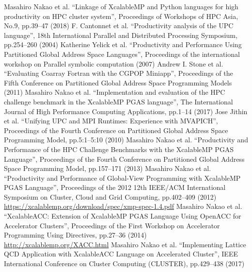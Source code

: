 \begin{thebibliography}{99.}%
%
%
 Masahiro Nakao  et al.
``Linkage of XcalableMP and Python languages for high productivity on HPC cluster system'', Proceedings of Workshops of HPC Asia, No.9, pp.39--47 (2018)
%
 F. Cantonnet et al.
  ``Productivity analysis of the UPC language'', 18th International Parallel and Distributed Processing Symposium, pp.254--260 (2004)
%
 Katherine Yelick et al.
  ``Productivity and Performance Using Partitioned Global Address Space Languages'', Proceedings of the international workshop on Parallel symbolic computation (2007)
%
 Andrew I. Stone et al.
``Evaluating Coarray Fortran with the CGPOP Miniapp'', Proceedings of the Fifth Conference on Partitioned Global Address Space Programming Models (2011)
%
 Masahiro Nakao et al.
``Implementation and evaluation of the HPC challenge benchmark in the XcalableMP PGAS language'',
The International Journal of High Performance Computing Applications, pp.1--14 (2017)
%
 Jose Jithin et al.
``Unifying UPC and MPI Runtimes: Experience with MVAPICH'',
Proceedings of the Fourth Conference on Partitioned Global Address Space Programming Model, pp.5:1--5:10 (2010)
%
 Masahiro Nakao et al.
``Productivity and Performance of the HPC Challenge Benchmarks with the XcalableMP PGAS Language'',
Proceedings of the Fourth Conference on Partitioned Global Address Space Programming Model, pp.157--171 (2013)
%
 Masahiro Nakao et al.
``Productivity and Performance of Global-View Programming with XcalableMP PGAS Language'',
Proceedings of the 2012 12th IEEE/ACM International Symposium on Cluster, Cloud and Grid Computing,
pp.402--409 (2012)
%
 \url{https://xcalablemp.org/download/spec/xmp-spec-1.4.pdf}
%
 Masahiro Nakao et al.
``XcalableACC: Extension of XcalableMP PGAS Language Using OpenACC for Accelerator Clusters'',
Proceedings of the First Workshop on Accelerator Programming Using Directives, pp.27--36 (2014)
%
 \url{http://xcalablemp.org/XACC.html}
%
 Masahiro Nakao et al.
``Implementing Lattice QCD Application with XcalableACC Language on Accelerated Cluster'',
IEEE International Conference on Cluster Computing (CLUSTER), pp.429--438 (2017)

\end{thebibliography}
